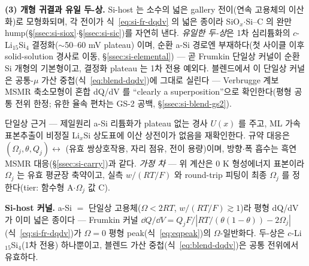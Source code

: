 \textbf{(3) 개형 귀결과 유일 두-상.} Si-host 는 소수의 넓은 gallery 전이(연속 고용체의 이산화)로 모형화되며, 각
전이가 식~\eqref{eq:si-fr-dqdv} 의 넓은 종이라 SiO$_x$$\cdot$Si--C 의 완만 hump(\S\ref{ssec:si-siox}$\cdot$\S\ref{ssec:si-sic})를
자연히 낸다. \emph{유일한 두-상}은 1차 심리튬화의 $c$-Li$_{15}$Si$_4$ 결정화($\sim$50--60 mV
plateau)\cite{obrovac_christensen2004,limthongkul2003} 이며, 순환 a-Si 경로엔 부재하다(첫 사이클 이후 solid-solution
경사로 이동, \S\ref{ssec:si-elemental}) --- 곧 Frumkin 단일상 커널이 순환 Si 개형의 기본형이고, 결정화 plateau 는
1차 전용 예외다. 블렌드에서 이 단일상 커널은 공통-$\mu$ 가산 중첩(식~\eqref{eq:blend-dqdv})에 그대로 실린다 ---
Verbrugge 계보 MSMR 축소모형이 혼합 dQ/dV 를 ``clearly a superposition''으로 확인한다\cite{tu_blend2024}(평형 공통
전위 한정; 유한 율속 편차는 GS-2 공백, \S\ref{ssec:si-blend-gs2}).

\begin{srcbox}
단일상 근거 --- 제일원리 a-Si 리튬화가 plateau 없는 경사 $U(x)$ 를 주고\cite{chevrier_dahn2009}, ML 가속 표본추출이
비정질 Li$_x$Si 상도표에 이산 상전이가 없음을 재확인한다\cite{artrith2018}. 규약 대응은 $(\Omega_j,\theta,Q_j)
\leftrightarrow$ (유효 쌍상호작용, 자리 점유, 전이 용량)이며, 방향$\cdot$폭 흡수는 흑연 MSMR 대응(\S\ref{ssec:si-carry})과
같다. \emph{가정 차} --- 위 계산은 $0$ K 형성에너지 표본이라 $\Omega_j$ 는 유효 평균장 축약이고, 실측 $w/(RT/F)$ 와
round-trip 피팅이 최종 $\Omega_j$ 를 정한다(tier: 함수형 A$\cdot$$\Omega_j$ 값 C).
\end{srcbox}

\begin{keybox}
\textbf{Si-host 커널.} a-Si $=$ 단일상 고용체($\Omega<2RT$, $w/(RT/F)\gtrsim1$)라 평형 dQ/dV 가 이미 넓은 종이다 ---
Frumkin 커널 $\dd Q/\dd V=Q_jF/|RT/(\theta(1-\theta))-2\Omega_j|$(식~\eqref{eq:si-fr-dqdv})가 $\Omega{=}0$ 평형
peak(식~\eqref{eq:eqpeak})의 $\Omega$-일반화다. 두-상은 $c$-Li$_{15}$Si$_4$(1차 전용) 하나뿐이고, 블렌드 가산
중첩(식~\eqref{eq:blend-dqdv})은 공통 전위에서 유효하다\cite{tu_blend2024}.
\end{keybox}

